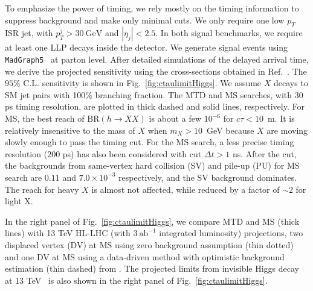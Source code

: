 To emphasize the power of timing, we rely mostly on the timing information to suppress background and make only 
minimal cuts. We only require one low $p_T$ ISR jet, with $p_T^j > 30~\text{GeV}$ and $|\eta_j| < 2.5$.
In both signal benchmarks, we require at least one LLP decays inside the detector. We generate signal events using {\tt MadGraph5}~\cite{Alwall:2014hca} at parton level. 
After detailed simulations of the delayed arrival time, we derive the projected sensitivity using the 
cross-sections obtained in Ref.~\cite{Greiner:2015jha}. The $95\%$ C.L. sensitivity is shown in Fig.~\ref{fig:ctaulimitHiggs}. 
We assume $X$ decays to SM jet pairs with 100\% branching fraction.
The MTD and MS searches, with $30$ ps timing resolution, are plotted in thick dashed and solid lines, respectively. 
For MS, the best reach of $\text{BR}(h\to XX)$ is about a few $10^{-6}$ for $c \tau < 10$~m. 
It is relatively insensitive to the mass of $X$ when $m_X> 10$~GeV because $X$ are moving slowly enough
to pass the timing cut. 
For the MS search, a less precise timing resolution 
($200$ ps) has also been considered with cut $\Delta t > 1$ ns. After the cut, the backgrounds from same-vertex hard collision (SV) and pile-up (PU) for MS search are $0.11$ and $7.0 \times 10^{-3}$ respectively, and the SV background dominates.  
The reach for heavy $X$ is almost not affected, 
while reduced by a factor of $\sim 2$ for light X.

In the right panel of Fig.~\ref{fig:ctaulimitHiggs}, we compare MTD and MS (thick lines) with 13 TeV  HL-LHC (with $3 ~\text{ab}^{-1}$ integrated luminosity) projections, two displaced vertex (DV) at 
MS using zero background assumption (thin dotted) and one DV at MS using a data-driven method with optimistic background estimation (thin dashed) from \cite{Coccaro:2016lnz}. 
The projected limits from invisible Higgs decay at 13 TeV~\cite{Bernaciak:2014pna} is also shown in the right panel of Fig.~\ref{fig:ctaulimitHiggs}. \\


